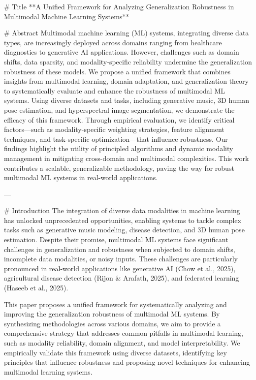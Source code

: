 # Title
**A Unified Framework for Analyzing Generalization Robustness in Multimodal Machine Learning Systems**

# Abstract
Multimodal machine learning (ML) systems, integrating diverse data types, are increasingly deployed across domains ranging from healthcare diagnostics to generative AI applications. However, challenges such as domain shifts, data sparsity, and modality-specific reliability undermine the generalization robustness of these models. We propose a unified framework that combines insights from multimodal learning, domain adaptation, and generalization theory to systematically evaluate and enhance the robustness of multimodal ML systems. Using diverse datasets and tasks, including generative music, 3D human pose estimation, and hyperspectral image segmentation, we demonstrate the efficacy of this framework. Through empirical evaluation, we identify critical factors—such as modality-specific weighting strategies, feature alignment techniques, and task-specific optimization—that influence robustness. Our findings highlight the utility of principled algorithms and dynamic modality management in mitigating cross-domain and multimodal complexities. This work contributes a scalable, generalizable methodology, paving the way for robust multimodal ML systems in real-world applications.

---

# Introduction
The integration of diverse data modalities in machine learning has unlocked unprecedented opportunities, enabling systems to tackle complex tasks such as generative music modeling, disease detection, and 3D human pose estimation. Despite their promise, multimodal ML systems face significant challenges in generalization and robustness when subjected to domain shifts, incomplete data modalities, or noisy inputs. These challenges are particularly pronounced in real-world applications like generative AI (Chow et al., 2025), agricultural disease detection (Rijon & Arafath, 2025), and federated learning (Haseeb et al., 2025).

This paper proposes a unified framework for systematically analyzing and improving the generalization robustness of multimodal ML systems. By synthesizing methodologies across various domains, we aim to provide a comprehensive strategy that addresses common pitfalls in multimodal learning, such as modality reliability, domain alignment, and model interpretability. We empirically validate this framework using diverse datasets, identifying key principles that influence robustness and proposing novel techniques for enhancing multimodal learning systems.


